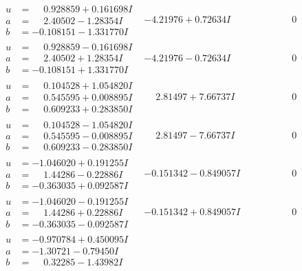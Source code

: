 \documentclass[1p]{elsarticle_modified}
\theoremstyle{definition}
\begin{document}
$$\begin{array}{c|c|c}
\begin{aligned}
u &= \phantom{-}0.928859 + 0.161698 I \\
a &= \phantom{-}2.40502 - 1.28354 I \\
b &= -0.108151 - 1.331770 I\end{aligned}
 & -4.21976 + 0.72634 I & \phantom{-0.000000 } 0 \\ \hline\begin{aligned}
u &= \phantom{-}0.928859 - 0.161698 I \\
a &= \phantom{-}2.40502 + 1.28354 I \\
b &= -0.108151 + 1.331770 I\end{aligned}
 & -4.21976 - 0.72634 I & \phantom{-0.000000 } 0 \\ \hline\begin{aligned}
u &= \phantom{-}0.104528 + 1.054820 I \\
a &= \phantom{-}0.545595 + 0.008895 I \\
b &= \phantom{-}0.609233 + 0.283850 I\end{aligned}
 & \phantom{-}2.81497 + 7.66737 I & \phantom{-0.000000 } 0 \\ \hline\begin{aligned}
u &= \phantom{-}0.104528 - 1.054820 I \\
a &= \phantom{-}0.545595 - 0.008895 I \\
b &= \phantom{-}0.609233 - 0.283850 I\end{aligned}
 & \phantom{-}2.81497 - 7.66737 I & \phantom{-0.000000 } 0 \\ \hline\begin{aligned}
u &= -1.046020 + 0.191255 I \\
a &= \phantom{-}1.44286 - 0.22886 I \\
b &= -0.363035 + 0.092587 I\end{aligned}
 & -0.151342 - 0.849057 I & \phantom{-0.000000 } 0 \\ \hline\begin{aligned}
u &= -1.046020 - 0.191255 I \\
a &= \phantom{-}1.44286 + 0.22886 I \\
b &= -0.363035 - 0.092587 I\end{aligned}
 & -0.151342 + 0.849057 I & \phantom{-0.000000 } 0 \\ \hline\begin{aligned}
u &= -0.970784 + 0.450095 I \\
a &= -1.30721 - 0.79450 I \\
b &= \phantom{-}0.32285 - 1.43982 I\end{aligned}

\end{array}$$
\end{document}
